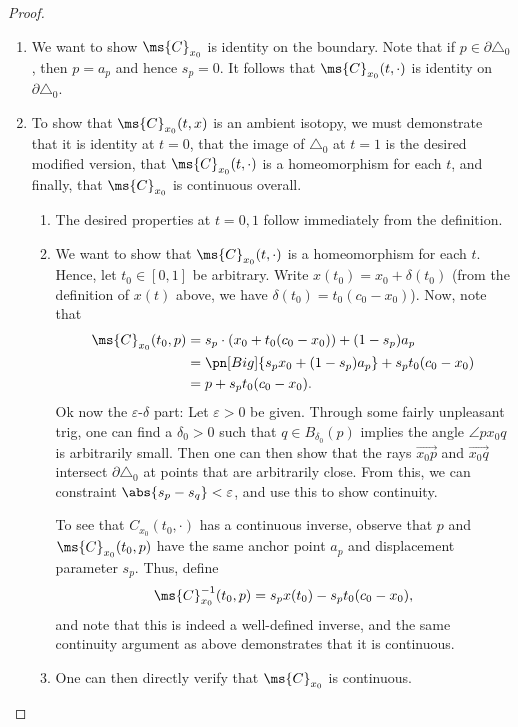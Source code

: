 \begin{proof}
\begin{enumerate}
    \item We want to show $\ms{C}_{x_0}$ is identity on the boundary.
      Note that if $p \in \partial \triangle_0$, then $p = a_p$ and
      hence $s_p = 0$. It follows that $\ms{C}_{x_0}(t, \cdot)$ is
      identity on $\partial \triangle_0$. \cmark
    \item To show that $\ms{C}_{x_0}(t, x)$ is an ambient isotopy,
      we must demonstrate that it is identity at $t=0$, that the
      image of $\triangle_0$ at $t=1$ is the desired modified
      version, that $\ms{C}_{x_0}(t, \cdot)$ is a homeomorphism for
      each $t$, and finally, that $\ms{C}_{x_0}$ is continuous
      overall.
      \begin{enumerate}[label=(\roman*)]
        \item The desired properties at $t = 0, 1$ follow
          immediately from the definition.
        \item We want to show that $\ms{C}_{x_0}(t, \cdot)$ is a
          homeomorphism for each $t$. Hence, let $t_0 \in [0,1]$ be
          arbitrary. Write $x(t_0) = x_0 + \delta(t_0)$ (from the
          definition of $x(t)$ above, we have $\delta(t_0) = t_0(c_0 -
          x_0)$). Now, note that
          \begin{align*}
            \ms{C}_{x_0}(t_0, p)
            &= s_p \cdot (x_0 + t_0(c_0 - x_0)) + (1-s_p) a_p \\
            &= \pn[Big]{s_p x_0 + (1-s_p) a_p} + s_pt_0 (c_0 - x_0) \\
            &= p + s_p t_0(c_0 - x_0).
          \end{align*}
          Ok now the $\varepsilon$-$\delta$ part: Let $\varepsilon > 0$
          be given. Through some fairly unpleasant trig, one can find a
          $\delta_0 > 0$ such that $q \in B_{\delta_0}(p)$ implies the
          angle $\angle p x_0 q$ is arbitrarily small.
          Then  one can then show that the rays
          $\overrightarrow{x_0 p}$ and $\overrightarrow{x_0 q}$
          intersect $\partial \triangle_0$ at points that are
          arbitrarily close. From this, we can constraint $\abs{s_p -
          s_q} < \varepsilon$, and use this to show continuity.

          To see that $C_{x_0}(t_0, \cdot)$ has a continuous inverse,
          observe that $p$ and $\ms{C}_{x_0}(t_0, p)$ have the same
          anchor point $a_p$ and displacement parameter $s_p$. Thus,
          define
          \[
          \ms{C}^{-1}_{x_0}(t_0, p) = s_p x(t_0) - s_p t_0 (c_0 -
          x_0),
          \]
          and note that this is indeed a well-defined inverse, and the
          same continuity argument as above demonstrates that it is
          continuous.
        \item One can then directly verify that $\ms{C}_{x_0}$ is
          continuous. \qedhere
      \end{enumerate}
  \end{enumerate}
\end{proof}

